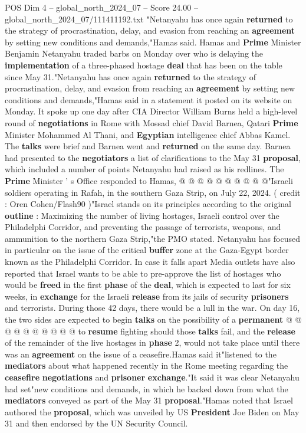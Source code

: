 \begin{textsample}{POS Dim 4 – global\_north\_2024\_07 – Score 24.00 – global\_north\_2024\_07/111411192.txt}  \label{ex:f4_pos_195}
"Netanyahu has once again \textbf{returned} to the strategy of procrastination, delay, and evasion from reaching an \textbf{agreement} by setting new conditions and demands,"Hamas said.
Hamas and \textbf{Prime} Minister Benjamin Netanyahu traded barbs on Monday over who is delaying the \textbf{implementation} of a three-phased hostage \textbf{deal} that has been on the table since May 31."Netanyahu has once again \textbf{returned} to the strategy of procrastination, delay, and evasion from reaching an \textbf{agreement} by setting new conditions and demands,"Hamas said in a statement it posted on its website on Monday.
It spoke up one day after CIA Director William Burns held a high-level round of \textbf{negotiations} in Rome with Mossad chief David Barnea, Qatari \textbf{Prime} Minister Mohammed Al Thani, and \textbf{Egyptian} intelligence chief Abbas Kamel.
The \textbf{talks} were brief and Barnea went and \textbf{returned} on the same day.
Barnea had presented to the \textbf{negotiators} a list of clarifications to the May 31 \textbf{proposal}, which included a number of points Netanyahu had raised as his redlines.
The \textbf{Prime} Minister ' s Office responded to Hamas, @ @ @ @ @ @ @ @ @ @"Israeli soldiers operating in Rafah, in the southern Gaza Strip, on July 22, 2024. ( credit : Oren Cohen/Flash90 )"Israel stands on its principles according to the original \textbf{outline} : Maximizing the number of living hostages, Israeli control over the Philadelphi Corridor, and preventing the passage of terrorists, weapons, and ammunition to the northern Gaza Strip,"the PMO stated.
Netanyahu has focused in particular on the issue of the critical \textbf{buffer} zone at the Gaza-Egypt border known as the Philadelphi Corridor.
In case it falls apart Media outlets have also reported that Israel wants to be able to pre-approve the list of hostages who would be \textbf{freed} in the first \textbf{phase} of the \textbf{deal}, which is expected to last for six weeks, in \textbf{exchange} for the Israeli \textbf{release} from its jails of security \textbf{prisoners} and terrorists.
During those 42 days, there would be a lull in the war.
On day 16, the two sides are expected to begin \textbf{talks} on the possibility of a \textbf{permanent} @ @ @ @ @ @ @ @ @ @ to \textbf{resume} fighting should those \textbf{talks} fail, and the \textbf{release} of the remainder of the live hostages in \textbf{phase} 2, would not take place until there was an \textbf{agreement} on the issue of a ceasefire.Hamas said it"listened to the \textbf{mediators} about what happened recently in the Rome meeting regarding the \textbf{ceasefire} \textbf{negotiations} and \textbf{prisoner} \textbf{exchange}."It said it was clear Netanyahu had set"new conditions and demands, in which he backed down from what the \textbf{mediators} conveyed as part of the May 31 \textbf{proposal}."Hamas noted that Israel authored the \textbf{proposal}, which was unveiled by US \textbf{President} Joe Biden on May 31 and then endorsed by the UN Security Council.

\end{textsample}
